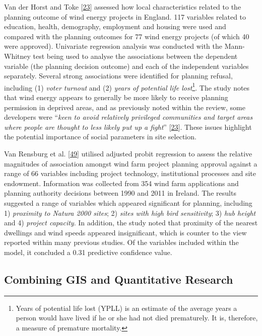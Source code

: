 \documentclass[a4paper,]{article}
\let\rmarkdownfootnote\footnote%
\def\footnote{\protect\rmarkdownfootnote}
\theoremstyle{definition}
\theoremstyle{definition}
\theoremstyle{definition}
\theoremstyle{remark}
\begin{document}
Van der Horst and Toke {[}\protect\hyperlink{ref-VanderHorst2010}{23}{]}
assessed how local characteristics related to the planning outcome of
wind energy projects in England. 117 variables related to education,
health, demography, employment and housing were used and compared with
the planning outcomes for 77 wind energy projects (of which 40 were
approved). Univariate regression analysis was conducted with the
Mann-Whitney test being used to analyse the associations between the
dependent variable (the planning decision outcome) and each of the
independent variables separately. Several strong associations were
identified for planning refusal, including (1) \emph{voter turnout} and
(2) \emph{years of potential life lost}\footnote{Years of potential life
  lost (YPLL) is an estimate of the average years a person would have
  lived if he or she had not died prematurely. It is, therefore, a
  measure of premature mortality.}. The study notes that wind energy
appears to generally be more likely to receive planning permission in
deprived areas, and as previously noted within the review, some
developers were ``\emph{keen to avoid relatively privileged communities
and target areas where people are thought to less likely put up a
fight}'' {[}\protect\hyperlink{ref-VanderHorst2010}{23}{]}. These issues
highlight the potential importance of social parameters in site
selection.

Van Rensburg et al. {[}\protect\hyperlink{ref-VanRensburg20}{49}{]}
utilised adjusted probit regression to assess the relative magnitudes of
association amongst wind farm project planning approval against a range
of 66 variables including project technology, institutional processes
and site endowment. Information was collected from 354 wind farm
applications and planning authority decisions between 1990 and 2011 in
Ireland. The results suggested a range of variables which appeared
significant for planning, including 1) \emph{proximity to Natura 2000
sites}; 2) \emph{sites with high bird sensitivity}; 3) \emph{hub height}
and 4) \emph{project capacity}. In addition, the study noted that
proximity of the nearest dwellings and wind speeds appeared
insignificant, which is counter to the view reported within many
previous studies. Of the variables included within the model, it
concluded a 0.31 predictive confidence value.

\subsection{Combining GIS and Quantitative
Research}\label{combining-gis-and-quantitative-research}
\end{document}

